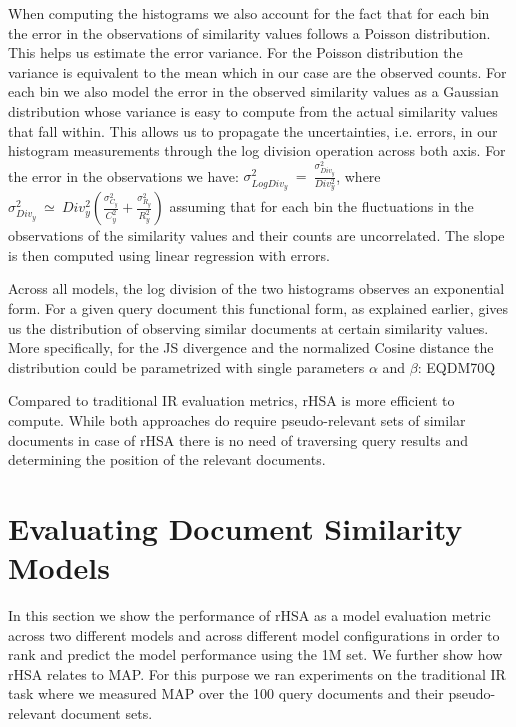 \documentclass[letterpaper]{article}
\begin{document}
When computing the histograms we also account for the fact that for each bin the error in the observations of similarity values follows a Poisson distribution. This helps us estimate the error variance. For the Poisson distribution the variance is equivalent to the mean which in our case are the observed counts. For each bin we also model the error in the observed similarity values as a Gaussian distribution whose variance is easy to compute from the actual similarity values that fall within. This allows us to propagate the uncertainties, i.e. errors, in our histogram measurements through the log division operation across both axis. For the error in the observations we have: $\sigma^{2}_{LogDiv_{y}}\:\mathtt{=}\:\frac{\sigma^{2}_{Div_{y}}}{Div^{2}_{y}}$, where $\sigma^{2}_{Div_{y}}\:\mathtt{\simeq}\:Div^{2}_{y}\left(\frac{\sigma^{2}_{C_{y}}}{C^{2}_{y}}+\frac{\sigma^{2}_{R_{y}}}{R^{2}_{y}}\right)$ assuming that for each bin the fluctuations in the observations of the similarity values and their counts are uncorrelated. The slope is then computed using linear regression with errors. 

Across all models, the log division of the two histograms observes an exponential form. For a given query document this functional form, as explained earlier, gives us the distribution of observing similar documents at certain similarity values. More specifically, for the JS divergence and the normalized Cosine distance the distribution could be parametrized with single parameters $\alpha$ and $\beta$: 
EQDM70Q

Compared to traditional IR evaluation metrics, rHSA is more efficient to compute. While both approaches do require pseudo-relevant sets of similar documents in case of rHSA there is no need of traversing query results and determining the position of the relevant documents. 

\section{Evaluating Document Similarity Models}

In this section we show the performance of rHSA as a model evaluation metric across two different models and across different model configurations in order to rank and predict the model performance using the 1M set. We further show how rHSA relates to MAP. For this purpose we ran experiments on the traditional IR task where we measured MAP over the 100 query documents and their pseudo-relevant document sets.
\end{document}
